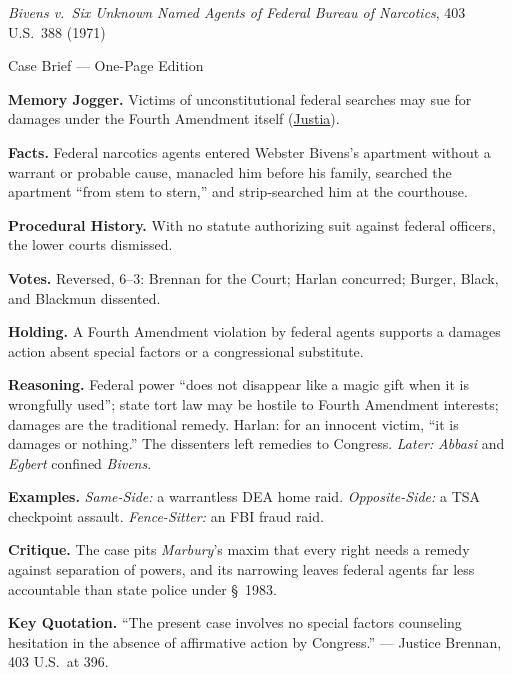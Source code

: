 \documentclass[12pt]{article}
\begin{document}
\begin{center}
{\Large \textit{Bivens v.\ Six Unknown Named Agents of Federal Bureau of Narcotics}, 403 U.S.\ 388 (1971)\par}
\vspace{0.3em}
{\normalsize Case Brief --- One-Page Edition\par}
\end{center}

\textbf{Memory Jogger.} Victims of unconstitutional federal searches may sue for damages under the Fourth Amendment itself (\href{https://supreme.justia.com/cases/federal/us/403/388/}{Justia}).

\textbf{Facts.} Federal narcotics agents entered Webster Bivens's apartment without a warrant or probable cause, manacled him before his family, searched the apartment ``from stem to stern,'' and strip-searched him at the courthouse.

\textbf{Procedural History.} With no statute authorizing suit against federal officers, the lower courts dismissed.

\textbf{Votes.} Reversed, 6--3: Brennan for the Court; Harlan concurred; Burger, Black, and Blackmun dissented.

\textbf{Holding.} A Fourth Amendment violation by federal agents supports a damages action absent special factors or a congressional substitute.

\textbf{Reasoning.} Federal power ``does not disappear like a magic gift when it is wrongfully used''; state tort law may be hostile to Fourth Amendment interests; damages are the traditional remedy. Harlan: for an innocent victim, ``it is damages or nothing.'' The dissenters left remedies to Congress. \emph{Later:} \textit{Abbasi} and \textit{Egbert} confined \textit{Bivens}.

\textbf{Examples.} \emph{Same-Side:} a warrantless DEA home raid. \emph{Opposite-Side:} a TSA checkpoint assault. \emph{Fence-Sitter:} an FBI fraud raid.

\textbf{Critique.} The case pits \textit{Marbury}'s maxim that every right needs a remedy against separation of powers, and its narrowing leaves federal agents far less accountable than state police under \S~1983.

\textbf{Key Quotation.} ``The present case involves no special factors counseling hesitation in the absence of affirmative action by Congress.'' --- Justice Brennan, 403 U.S.\ at 396.
\end{document}
